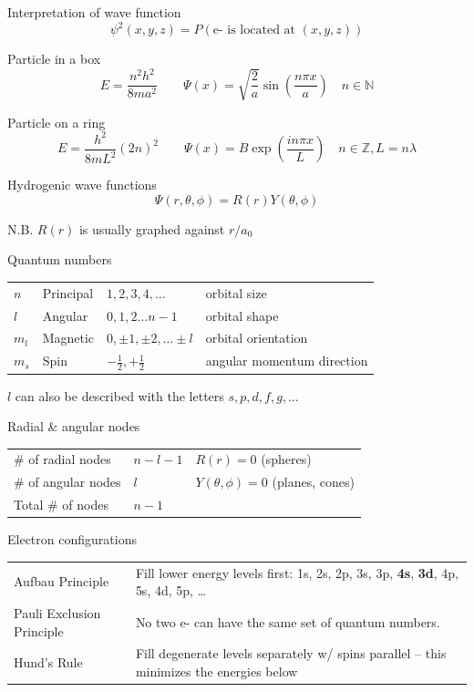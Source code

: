 \documentclass[10pt,landscape]{article}
\newcommand{\extraline}{\vspace{1em}}
\newcommand{\halfline}{\vspace{0.5em}}
\newcommand{\tableindent}{\hspace{1.5em}}
\begin{document}
\begin{multicols}{3}
Interpretation of wave function
\[ \psi^2(x,y,z) = P(\text{e- is located at }(x,y,z))  \]

Particle in a box
\[  E = \frac{n^2h^2}{8ma^2} 
\qquad
\Psi(x) = \sqrt{\frac{2}{a}} \sin\left( \frac{n\pi x}{a} \right)  \quad n \in \mathbb{N} \]

Particle on a ring
\[ E = \frac{h^2}{8mL^2} (2n)^2 
\qquad
\Psi(x) = B \exp \left(\frac{in\pi x}{L} \right)
\quad n \in \mathbb{Z}, L = n\lambda  \]

Hydrogenic wave functions
\[ \Psi(r,\theta,\phi) = R(r) Y(\theta,\phi) \]

\tableindent N.B. $R(r)$ is usually graphed against $r/a_0$
\halfline

Quantum numbers 
\begin{tabular}{@{\tableindent}lllp{2.5cm}@{}}
$n$ & Principal & $1, 2, 3, 4, \ldots $ & \scriptsize{orbital size} \\
$l$ & Angular & $0, 1, 2 \dots  n-1 $ & \scriptsize{orbital shape} \\
$m_l$ & Magnetic & $0, \pm 1, \pm 2, \ldots \pm l $ & \scriptsize{orbital orientation} \\
$m_s$ & Spin & $-\frac{1}{2}, +\frac{1}{2} $ &  \scriptsize{angular momentum direction} \\
\end{tabular}

\halfline
\tableindent $l$ can also be described with the letters $s, p, d, f, g, \ldots$
\halfline

Radial \& angular nodes

\begin{tabular}{@{\tableindent}llp{2.4cm}@{}}
\# of radial nodes & $n-l-1$ & $R(r) = 0$ \scriptsize{(spheres)}\\
\# of angular nodes & $l$ &  $Y(\theta,\phi)=0$ \scriptsize{(planes, cones)} \\
Total \# of nodes & $n-1$ & 
\end{tabular}
\extraline

Electron configurations

\begin{tabular}{@{\tableindent}p{2.5cm}p{4.5cm}@{}}
Aufbau Principle & Fill lower energy levels first: 1s, 2s, 2p, 3s, 3p, \textbf{4s}, \textbf{3d}, 4p, 5s, 4d, 5p, \ldots\\
Pauli Exclusion Principle & No two e- can have the same set of quantum numbers. \\
Hund's Rule & Fill degenerate levels separately w/ spins parallel -- this minimizes the energies below \\
\end{tabular}
\extraline


\end{multicols}
\end{document}

